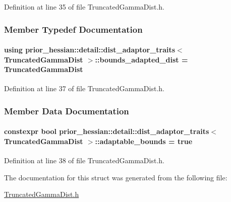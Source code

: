 Definition at line 35 of file Truncated\+Gamma\+Dist.\+h.



\subsubsection{Member Typedef Documentation}
\paragraph[{\texorpdfstring{bounds\+\_\+adapted\+\_\+dist}{bounds_adapted_dist}}]{\setlength{\rightskip}{0pt plus 5cm}using {\bf prior\+\_\+hessian\+::detail\+::dist\+\_\+adaptor\+\_\+traits}$<$ {\bf Truncated\+Gamma\+Dist} $>$\+::{\bf bounds\+\_\+adapted\+\_\+dist} =  {\bf Truncated\+Gamma\+Dist}}\hypertarget{structprior__hessian_1_1detail_1_1dist__adaptor__traits_3_01TruncatedGammaDist_01_4_a8bf24f31586d1711db6d94be55d00e44}{}\label{structprior__hessian_1_1detail_1_1dist__adaptor__traits_3_01TruncatedGammaDist_01_4_a8bf24f31586d1711db6d94be55d00e44}


Definition at line 37 of file Truncated\+Gamma\+Dist.\+h.



\subsubsection{Member Data Documentation}
\paragraph[{\texorpdfstring{adaptable\+\_\+bounds}{adaptable_bounds}}]{\setlength{\rightskip}{0pt plus 5cm}constexpr bool {\bf prior\+\_\+hessian\+::detail\+::dist\+\_\+adaptor\+\_\+traits}$<$ {\bf Truncated\+Gamma\+Dist} $>$\+::adaptable\+\_\+bounds = true\hspace{0.3cm}{\ttfamily [static]}}\hypertarget{structprior__hessian_1_1detail_1_1dist__adaptor__traits_3_01TruncatedGammaDist_01_4_a302fc7ace5815b5946b1153da7805072}{}\label{structprior__hessian_1_1detail_1_1dist__adaptor__traits_3_01TruncatedGammaDist_01_4_a302fc7ace5815b5946b1153da7805072}


Definition at line 38 of file Truncated\+Gamma\+Dist.\+h.



The documentation for this struct was generated from the following file\+:\begin{DoxyCompactItemize}
\item 
\hyperlink{TruncatedGammaDist_8h}{Truncated\+Gamma\+Dist.\+h}\end{DoxyCompactItemize}
